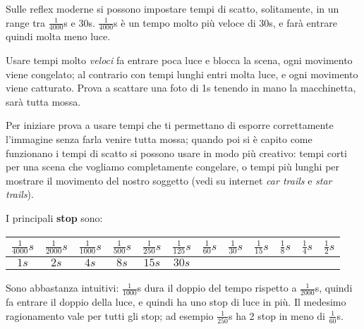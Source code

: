 Sulle reflex moderne si possono impostare tempi di scatto, solitamente, in un range tra $\frac{1}{4000}$s e 30s.\newline
$\frac{1}{4000}$s è un tempo molto più veloce di 30s, e farà entrare quindi molta meno luce.

Usare tempi molto \textit{veloci} fa entrare poca luce e blocca la scena, ogni movimento viene congelato; al contrario con tempi lunghi entri molta luce, e ogni movimento viene catturato. Prova a scattare una foto di 1s tenendo in mano la macchinetta, sarà tutta mossa.

Per iniziare prova a usare tempi che ti permettano di esporre correttamente l'immagine senza farla venire tutta mossa; quando poi si è capito come funzionano i tempi di scatto si possono usare in modo più creativo: tempi corti per una scena che vogliamo completamente congelare, o tempi più lunghi per mostrare il movimento del nostro soggetto (vedi su internet \textit{car trails} e \textit{star trails}).

I principali \textbf{stop} sono:
\begin{table}[h]
    \centering
    \begin{tabular}{|c|c|c|c|c|c|c|c|c|c|c|c|} 
        \hline
        $\frac{1}{4000}s$ & $\frac{1}{2000}s$ & $\frac{1}{1000}s$ & $\frac{1}{500}s$ & $\frac{1}{250}s$                                & $\frac{1}{125}s$ & $\frac{1}{60}s$       & $\frac{1}{30}s$       & $\frac{1}{15}s$       & $\frac{1}{8}s$        & $\frac{1}{4}s$        & $\frac{1}{2}s$         \\[0.3cm] 
        \hline
        $1s$              & $2s$              & $4s$              & $8s$             & $15s$ & $30s$            & \multicolumn{1}{l|}{} & \multicolumn{1}{l|}{} & \multicolumn{1}{l|}{} & \multicolumn{1}{l|}{} & \multicolumn{1}{l|}{} & \multicolumn{1}{l|}{}  \\
        \hline
    \end{tabular}
\end{table}

Sono abbastanza intuitivi: $\frac{1}{1000}$s dura il doppio del tempo rispetto a $\frac{1}{2000}$s, quindi fa entrare il doppio della luce, e quindi ha uno stop di luce in più.\newline
Il medesimo ragionamento vale per tutti gli stop; ad esempio $\frac{1}{250}$s ha 2 stop in meno di $\frac{1}{60}$s.


